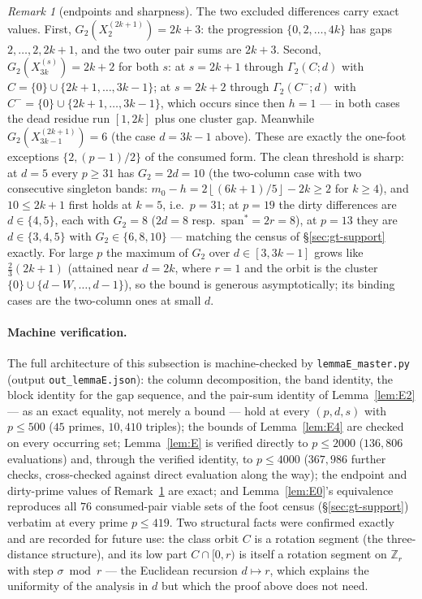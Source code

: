 \documentclass[11pt,a4paper]{article}
\numberwithin{equation}{section}
\theoremstyle{plain}
\theoremstyle{plain}
\theoremstyle{definition}
\theoremstyle{remark}
\newtheorem{remark}[theorem]{Remark}
\newcommand{\Z}{\mathbb{Z}}
\newcommand{\floor}[1]{\left\lfloor #1 \right\rfloor}
\begin{document}
\begin{remark}[endpoints and sharpness]\label{rem:Esharp}
The two excluded differences carry exact values. First,
$G_2(X^{(2k+1)}_2)=2k{+}3$: the progression $\{0,2,\dots,4k\}$ has gaps
$2,\dots,2,2k{+}1$, and the two outer pair sums are $2k+3$. Second,
$G_2(X^{(s)}_{3k})=2k{+}2$ for both $s$: at $s=2k{+}1$ through
$\Gamma_2(C;d)$ with $C=\{0\}\cup\{2k{+}1,\dots,3k-1\}$; at
$s=2k{+}2$ through $\Gamma_2(C^-;d)$ with
$C^-=\{0\}\cup\{2k{+}1,\dots,3k-1\}$, which occurs since then $h=1$
--- in both cases the dead residue run $[1,2k]$ plus one cluster gap.
Meanwhile $G_2(X^{(2k+1)}_{3k-1})=6$ (the case $d=3k-1$ above). These
are exactly the one-foot exceptions $\{2,(p{-}1)/2\}$ of the consumed
form. The clean threshold is sharp: at $d=5$ every $p\ge31$ has
$G_2=2d=10$ (the two-column case with two consecutive singleton bands:
$m_0-h=2\floor{(6k+1)/5}-2k\ge2$ for $k\ge4$), and $10\le2k+1$ first
holds at $k=5$, i.e.\ $p=31$; at $p=19$ the dirty differences are
$d\in\{4,5\}$, each with $G_2=8$ ($2d=8$ resp.\
$\mathrm{span}^\ast=2r=8$), at $p=13$ they are $d\in\{3,4,5\}$ with
$G_2\in\{6,8,10\}$ --- matching the census of \S\ref{sec:gt-support}
exactly. For large $p$ the maximum of $G_2$ over $d\in[3,3k-1]$ grows
like $\tfrac23(2k+1)$ (attained near $d=2k$, where $r=1$ and the orbit
is the cluster $\{0\}\cup\{d-W,\dots,d-1\}$), so the bound is generous
asymptotically; its binding cases are the two-column ones at small
$d$.
\end{remark}

\paragraph{Machine verification.}
The full architecture of this subsection is machine-checked by
\texttt{lemmaE\_\allowbreak master.py} (output
\texttt{out\_\allowbreak lemmaE.json}): the
column decomposition, the band identity, the block identity for the gap
sequence, and the pair-sum identity of Lemma~\ref{lem:E2} --- as an
exact equality, not merely a bound --- hold at every $(p,d,s)$ with
$p\le500$ ($45$ primes, $10{,}410$ triples); the bounds of
Lemma~\ref{lem:E4} are checked on every occurring set;
Lemma~\ref{lem:E} is verified directly to $p\le2000$ ($136{,}806$
evaluations) and, through the verified identity, to $p\le4000$
($367{,}986$ further checks, cross-checked against direct evaluation
along the way); the endpoint and dirty-prime values of
Remark~\ref{rem:Esharp} are exact; and Lemma~\ref{lem:E0}'s equivalence
reproduces all $76$ consumed-pair viable sets of the foot census
(\S\ref{sec:gt-support}) verbatim at every prime $p\le419$. Two
structural facts were confirmed exactly and are recorded for future
use: the class orbit $C$ is a rotation segment (the three-distance
structure), and its low part $C\cap[0,r)$ is itself a rotation segment
on $\Z_r$ with step $\sigma\bmod r$ --- the Euclidean recursion
$d\mapsto r$, which explains the uniformity of the analysis in $d$ but
which the proof above does not need.
\end{document}
